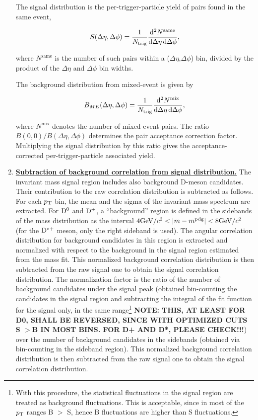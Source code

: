 \begin{enumerate}
The signal distribution is the per-trigger-particle yield of pairs found in the same event,
\begin{linenomath}
\begin{equation}
\label{eq:signal}
S(\Delta\eta,\Delta\phi) = \frac{1}{N_\text{trig}}\frac{\mathrm{d}^{2}N^\text{same}}{\mathrm{d}\Delta\eta\, \mathrm{d}\Delta\phi},
\end{equation}
\end{linenomath}
where $N^\text{same}$ is the number of such pairs within a ($\Delta\eta$,$\Delta\phi$) bin, divided by the product of the $\Delta\eta$ and $\Delta\phi$ bin widths.

The background distribution from mixed-event is given by
\begin{linenomath}
\begin{equation}
\label{eq:background}
B_{ME}(\Delta\eta,\Delta\phi) = \frac{1}{N_\text{trig}}\frac{\mathrm{d}^{2}N^\text{mix}}{\mathrm{d}\Delta\eta\, \mathrm{d}\Delta\phi},
\end{equation}
\end{linenomath}
where $N^\text{mix}$ denotes the number of
mixed-event pairs.
The ratio $B(0,0)/B(\Delta\eta,\Delta\phi)$
determines the pair acceptance correction
factor. Multiplying the signal distribution by this ratio
gives the acceptance-corrected per-trigger-particle associated
yield.

\item
\underline {\bf Subtraction of background correlation from signal distribution.}
The invariant mass signal region includes also background D-meson candidates. Their contribution to the
raw correlation distribution is subtracted as follows. For each $p_{\rm T}$ bin, the mean and the sigma of the
invariant mass spectrum are extracted. For ${\rm D^0}$ and ${\rm D^+}$, a ``background'' region is defined in the sidebands of the mass
distribution as the interval $4 \gev/c^2<|m-m^{\rm pdg}|<8 \gev/c^2$ (for the ${\rm D^{*+}}$ meson, only the right sideband is used). The angular correlation distribution
for background candidates in this region is extracted and normalized with respect to the background in the signal region
estimated from the mass fit. This normalized background correlation distribution is then subtracted from the
raw signal one to obtain the signal correlation distribution. The normalization factor is the ratio of the number of background candidates under the signal peak (obtained bin-counting the candidates in the signal region and subtracting the integral of the fit function for the signal only, in the same range\footnote{With this procedure, the statistical fluctuations in the signal region are treated as background fluctuations. This is acceptable, since in most of the $p_{\rm T}$ ranges B $>$ S, hence B fluctuations are higher than S fluctuations.} {\bf NOTE: THIS, AT LEAST FOR D0, SHALL BE REVERSED, SINCE WITH OPTIMIZED CUTS S $>$B IN MOST BINS. FOR D+ AND D*, PLEASE CHECK!!!}) over the number of background candidates in the sidebands (obtained via bin-counting in the sideband region). This normalized background correlation distribution is then subtracted from the
raw signal one to obtain the signal correlation distribution.


\end{enumerate}
